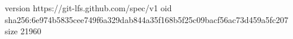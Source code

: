 version https://git-lfs.github.com/spec/v1
oid sha256:6e974b5835cee749f6a329dab844a35f168b5f25c09bacf56ac73d459a5fc207
size 21960
